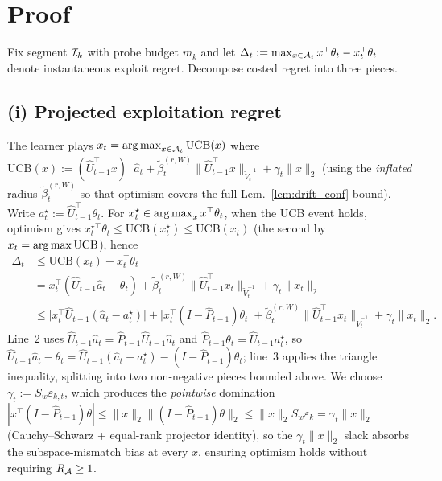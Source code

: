 \section*{Proof}

Fix segment $\mathcal{I}_k$ with probe budget $m_k$ and let
$\Delta_t:=\max_{x\in\mathcal{A}_t}x^\top\theta_t - x_t^\top\theta_t$ denote
instantaneous exploit regret. Decompose costed regret into three pieces.

\subsection*{(i) Projected exploitation regret}

The learner plays
$x_t=\operatorname*{arg\,max}_{x\in\mathcal{A}_t}\mathrm{UCB}(x)$ where
$\mathrm{UCB}(x) := (\widehat U_{t-1}^\top x)^\top\widehat a_t
+ \widetilde\beta_t^{(r,W)}\|\widehat U_{t-1}^\top x\|_{\widetilde V_t^{-1}}
+ \gamma_t\|x\|_2$
(using the \emph{inflated} radius $\widetilde\beta_t^{(r,W)}$ so that
optimism covers the full Lem.~\ref{lem:drift_conf} bound).
Write $a_t^\star:=\widehat U_{t-1}^\top\theta_t$. For
$x_t^\star\in\operatorname*{arg\,max}_x x^\top\theta_t$, when the UCB event holds,
optimism gives
$x_t^{\star\top}\theta_t\le\mathrm{UCB}(x_t^\star)\le\mathrm{UCB}(x_t)$
(the second by $x_t=\operatorname*{arg\,max}\mathrm{UCB}$), hence
\begin{align*}
\Delta_t
&\le \mathrm{UCB}(x_t) - x_t^\top\theta_t \\
&= x_t^\top(\widehat U_{t-1}\widehat a_t - \theta_t)
 + \widetilde\beta_t^{(r,W)}\|\widehat U_{t-1}^\top x_t\|_{\widetilde V_t^{-1}}
 + \gamma_t\|x_t\|_2 \\
&\le \bigl|x_t^\top\widehat U_{t-1}(\widehat a_t - a_t^\star)\bigr|
 + \bigl|x_t^\top(I - \widehat P_{t-1})\theta_t\bigr|
 + \widetilde\beta_t^{(r,W)}\|\widehat U_{t-1}^\top x_t\|_{\widetilde V_t^{-1}}
 + \gamma_t\|x_t\|_2.
\end{align*}
Line~2 uses $\widehat U_{t-1}\widehat a_t = \widehat P_{t-1}\widehat U_{t-1}\widehat a_t$
and $\widehat P_{t-1}\theta_t = \widehat U_{t-1}a_t^\star$, so
$\widehat U_{t-1}\widehat a_t-\theta_t = \widehat U_{t-1}(\widehat a_t-a_t^\star)-(I-\widehat P_{t-1})\theta_t$;
line~3 applies the triangle inequality, splitting into two non-negative
pieces bounded above. We choose $\gamma_t := S_w\varepsilon_{k,t}$,
which produces the \emph{pointwise} domination
$|x^\top(I-\widehat P_{t-1})\theta|\le\|x\|_2\|(I-\widehat P_{t-1})\theta\|_2\le\|x\|_2 S_w\varepsilon_k=\gamma_t\|x\|_2$
(Cauchy--Schwarz + equal-rank projector identity), so the $\gamma_t\|x\|_2$
slack absorbs the subspace-mismatch bias at every $x$, ensuring optimism
holds without requiring $R_{\mathcal{A}}\ge 1$.


